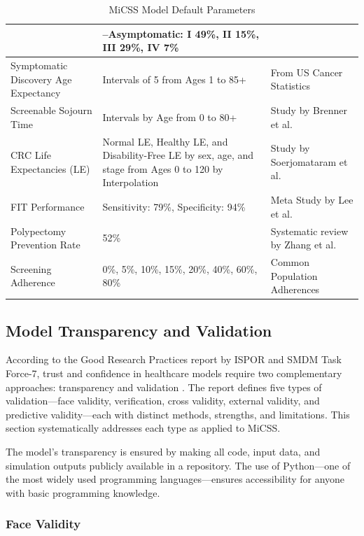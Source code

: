 \documentclass[sn-mathphys-num]{sn-jnl}%
\theoremstyle{thmstyleone}%
\theoremstyle{thmstyletwo}%
\theoremstyle{thmstylethree}%
\begin{document}
\begin{table}[h]
\begin{tabularx}{\textwidth}{|X|X|X|}
                       & --Asymptomatic: I 49\%, II 15\%, III 29\%, IV 7\% & \\ \hline
Symptomatic Discovery Age Expectancy & Intervals of 5 from Ages 1 to 85+ & From US Cancer Statistics \cite{noauthor_uscs_2024} \\ \hline
Screenable Sojourn Time & Intervals by Age from 0 to 80+ & Study by Brenner et al. \cite{brenner_sojourn_2011} \\ \hline
CRC Life Expectancies (LE) & Normal LE, Healthy LE, and Disability-Free LE by sex, age, and stage from Ages 0 to 120 by Interpolation & Study by Soerjomataram et al. \cite{soerjomataram_most_2012} \\ \hline
FIT Performance & Sensitivity: 79\%, Specificity: 94\% & Meta Study by Lee et al. \cite{lee_accuracy_2014} \\ \hline
Polypectomy Prevention Rate & 52\% & Systematic review by Zhang et al. \cite{zhang_colonoscopic_2020} \\ \hline
Screening Adherence & 0\%, 5\%, 10\%, 15\%, 20\%, 40\%, 60\%, 80\% & Common Population Adherences \cite{navarro_colorectal_2017} \\ \hline
\end{tabularx}
\caption{MiCSS Model Default Parameters}
\label{table:micss_model_default_parameters}
\end{table}

\subsection{Model Transparency and Validation}

According to the Good Research Practices report by ISPOR and SMDM Task Force-7, trust and confidence in healthcare models require two complementary approaches: transparency and validation \cite{eddy_model_2012}. The report defines five types of validation---face validity, verification, cross validity, external validity, and predictive validity---each with distinct methods, strengths, and limitations. This section systematically addresses each type as applied to MiCSS.

The model's transparency is ensured by making all code, input data, and simulation outputs publicly available in a repository. The use of Python---one of the most widely used programming languages---ensures accessibility for anyone with basic programming knowledge.

\subsubsection{Face Validity}
\end{document}
